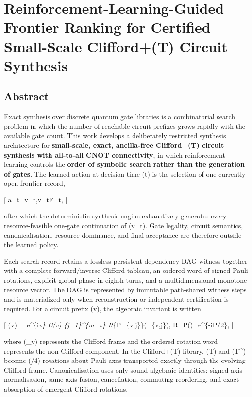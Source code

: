 \documentclass[
]{article}
\author{}
\date{}
\begin{document}
\hypertarget{reinforcement-learning-guided-frontier-ranking-for-certified-small-scale-cliffordt-circuit-synthesis}{%
\section{Reinforcement-Learning-Guided Frontier Ranking for Certified
Small-Scale Clifford+(T) Circuit
Synthesis}\label{reinforcement-learning-guided-frontier-ranking-for-certified-small-scale-cliffordt-circuit-synthesis}}

\hypertarget{abstract}{%
\subsection{Abstract}\label{abstract}}

Exact synthesis over discrete quantum gate libraries is a combinatorial
search problem in which the number of reachable circuit prefixes grows
rapidly with the available gate count. This work develops a deliberately
restricted synthesis architecture for \textbf{small-scale, exact,
ancilla-free Clifford+(T) circuit synthesis with all-to-all CNOT
connectivity}, in which reinforcement learning controls the
\textbf{order of symbolic search rather than the generation of gates}.
The learned action at decision time (t) is the selection of one
currently open frontier record,

{[} a\_t=v\_t,\qquad v\_t\in\mathcal F\_t, {]}

after which the deterministic synthesis engine exhaustively generates
every resource-feasible one-gate continuation of (v\_t). Gate legality,
circuit semantics, canonicalisation, resource dominance, and final
acceptance are therefore outside the learned policy.

Each search record retains a lossless persistent dependency-DAG witness
together with a complete forward/inverse Clifford tableau, an ordered
word of signed Pauli rotations, explicit global phase in eighth-turns,
and a multidimensional monotone resource vector. The DAG is represented
by immutable path-shared witness steps and is materialized only when
reconstruction or independent certification is required. For a circuit
prefix (v), the algebraic invariant is written

{[} (v) = e\^{}\{i\phi\emph{v\} C(\Theta\emph{v)
\prod}\{j=1\}\^{}\{m\_v\} R}\{P\_\{v,j\}\}(\theta\_\{v,j\}), \qquad
R\_P(\theta)=e\^{}\{-i\theta P/2\}, {]}

where (\Theta\_v) represents the Clifford frame and the ordered rotation
word represents the non-Clifford component. In the Clifford+(T) library,
(T) and (T\^{}\dagger) become (\pm\pi/4) rotations about Pauli axes
transported exactly through the evolving Clifford frame.
Canonicalisation uses only sound algebraic identities: signed-axis
normalisation, same-axis fusion, cancellation, commuting reordering, and
exact absorption of emergent Clifford rotations.
\end{document}
